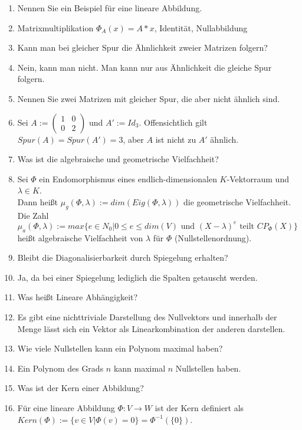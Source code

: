 \documentclass[11pt,parskip=full]{scrartcl}
\newcommand{\answer}{\item[\textbf{Antwort}]}
\begin{document}
\begin{enumerate}[label=\textbf{\arabic*. Frage}]
		\item Nennen Sie ein Beispiel für eine lineare Abbildung.
		\answer Matrixmultiplikation \(\Phi_A(x) = A*x\), Identität, Nullabbildung
		
		\item Kann man bei gleicher Spur die Ähnlichkeit zweier Matrizen folgern?
		\answer Nein, kann man nicht. Man kann nur aus Ähnlichkeit die gleiche Spur folgern.
		
		\item Nennen Sie zwei Matrizen mit gleicher Spur, die aber nicht ähnlich sind.
		\answer Sei \(A:=\begin{pmatrix} 1 & 0 \\ 0 & 2 \end{pmatrix}\) und \(A':=Id_3\). Offensichtlich gilt \(Spur(A) = Spur(A') = 3\), aber $A$ ist nicht zu $A'$ ähnlich.
		
		\item Was ist die algebraische und geometrische Vielfachheit?
		\answer Sei $\Phi$ ein Endomorphismus eines endlich-dimensionalen $K$-Vektorraum und \(\lambda \in K\).\\
		Dann heißt \(\mu_{g}(\Phi, \lambda) := dim(Eig(\Phi, \lambda))\) die geometrische Vielfachheit.\\
		Die Zahl \(\mu_a(\Phi, \lambda) := max\{e \in N_0 | 0 \leq e \leq dim(V) \text{ und } (X-\lambda)^e \text{ teilt } CP_\Phi(X)\}\) heißt algebraische Vielfachheit von $\lambda$ für $\Phi$ (Nullstellenordnung).
		
		\item Bleibt die Diagonalisierbarkeit durch Spiegelung erhalten?
		\answer Ja, da bei einer Spiegelung lediglich die Spalten getauscht werden.
		
		\item Was heißt Lineare Abhängigkeit?
		\answer Es gibt eine nichttriviale Darstellung des Nullvektors und innerhalb der Menge lässt sich ein Vektor als Linearkombination der anderen darstellen.
		
		\item Wie viele Nullstellen kann ein Polynom maximal haben?
		\answer Ein Polynom des Grads $n$ kann maximal $n$ Nullstellen haben.
		
		\item Was ist der Kern einer Abbildung?
		\answer Für eine lineare Abbildung \(\Phi : V \rightarrow W\) ist der Kern definiert als \(Kern(\Phi) := \{v \in V | \Phi(v) = 0\} = \Phi^{-1}(\{0\})\).
		

\end{enumerate}
\end{document}
